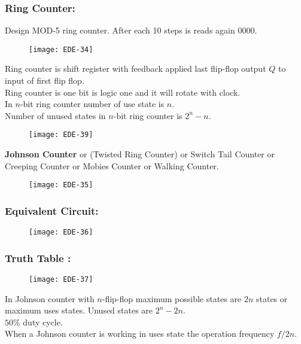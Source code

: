 \begin{enumerate}
\subsubsection{Ring Counter:}
Design MOD-5 ring counter. After each 10 steps is reads again 0000.
\begin{figure}[H]
	\centering
	\texttt{[image: EDE-34]}
\end{figure}
Ring counter is shift register with feedback applied last flip-flop output $Q$ to input of first flip flop.\\
Ring counter is one bit is logic one and it will rotate with clock.\\
In $n$-bit ring counter number of use state is $n$.\\
Number of unused states in $n$-bit ring counter is $2^{n}-n$.
\begin{figure}[H]
	\centering
	\texttt{[image: EDE-39]}
\end{figure}
\textbf{Johnson Counter } or (Twisted Ring Counter) or Switch Tail Counter or Creeping Counter or Mobies Counter or Walking Counter.
\begin{figure}[H]
	\centering
	\texttt{[image: EDE-35]}
\end{figure}
\subsubsection{ Equivalent Circuit: }
\begin{figure}[H]
	\centering
	\texttt{[image: EDE-36]}
\end{figure}
\subsubsection{ Truth Table : }
\begin{figure}[H]
	\centering
	\texttt{[image: EDE-37]}
\end{figure}
In Johnson counter with $n$-flip-flop maximum possible states are $2 n$ states or maximum uses states. Unused states are $2^{n}-2 n$.\\
$50 \%$ duty cycle.\\
When a Johnson counter is working in uses state the operation frequency $f / 2 n$.\\
 \end{enumerate}










